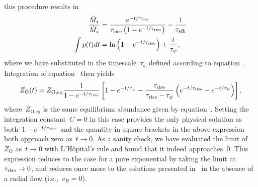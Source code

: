 \documentclass[main.tex]{subfiles}
\begin{document}
this procedure results in
\begin{subequations}\begin{align}
\frac{\ddot{M}_\star}{\dot{M}_\star} &=
\frac{
	e^{-t / \tau_\text{rise}}
}{
	\tau_\text{rise}\left(
	1 - e^{-t / \tau_\text{rise}}
	\right)
} - \frac{1}{\tau_\text{sfh}}
\\
\int p(t) dt &= \ln\left(1 - e^{-t / \tau_\text{rise}}\right) +
\frac{t}{\tau_\psi},
\end{align}\end{subequations}
where we have substituted in the timescale~$\tau_\psi$ defined according to
equation~.
Integration of equation~ then yields
\begin{equation}
Z_\text{O}(t) = Z_\text{O,eq}
\frac{1}{1 - e^{-t / \tau_\text{rise}}} \left[
1 - e^{-t / \tau_\psi} -
\frac{\tau_\text{rise}}{\tau_\text{rise} - \tau_\psi}
\left(e^{-t / \tau_\text{rise}} - e^{-t / \tau_\psi}\right)
\right],
\end{equation}
where~$Z_\text{O,eq}$ is the same equilibrium abundance given by
equation~.
Setting the integration constant~$C = 0$ in this case provides the only
physical solution as both~$1 - e^{-t / \tau_\text{rise}}$ and the quantity in
square brackets in the above expression both approach zero as~$t \rightarrow 0$.
As a sanity check, we have evaluated the limit of~$Z_\text{O}$
as~$t \rightarrow 0$ with L'H\^opital's rule and found that it indeed
approaches~$0$.
This expression reduces to the case for a pure exponential by taking the limit
at~$\tau_\text{rise} \rightarrow 0$, and reduces once more to the solutions
presented in~\citet{Weinberg2017b} in the absence of a radial flow
(i.e.,~$v_R = 0$).
\end{document}
